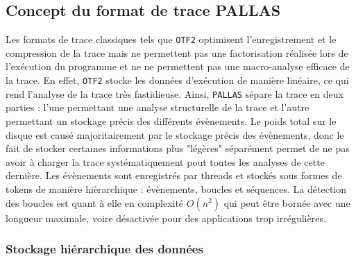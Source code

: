 

\subsection{Concept du format de trace PALLAS}\label{ssec:pallas_status}

Les formats de trace classiques tels que \verb!OTF2! optimisent l'enregistrement et le compression de la trace mais ne permettent pas une factorisation réalisée lors de l'exécution du programme 
et ne ne permettent pas une macro-analyse efficace de la trace. En effet, \verb!OTF2! stocke les données d'exécution de manière linéaire, ce qui rend l'analyse de la trace très fastidieuse.\newline
Ainsi, \verb!PALLAS! sépare la trace en deux parties : l'une permettant une analyse structurelle de la trace et l'autre permettant un stockage précis des différents évènements.
Le poids total sur le disque est causé majoritairement par le stockage précis des évènements, donc le fait de stocker certaines informations plus "légères" séparément permet de ne pas 
avoir à charger la trace systématiquement pout toutes les analyses de cette dernière.\newline
Les évènements sont enregistrés par threads et stockés sous formes de tokens de manière hièrarchique : évènements, boucles et séquences.\newline
La détection des boucles est quant à elle en complexité $O(n^2)$ qui peut être bornée avec une longueur maximale, voire désactivée pour des applications trop irrégulières.

\subsubsection{Stockage hiérarchique des données}\label{ssec:hierarchy}

